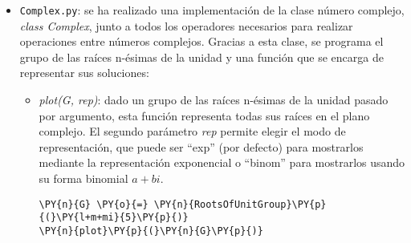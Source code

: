 \begin{itemize}
\begin{itemize}
    \begin{Verbatim}[commandchars=\\\{\}]
p(1)=3
p(2)=5
p(3)=1
p(4)=4
p(5)=2
    \end{Verbatim}

   \item  \textit{even\_permutation}, \textit{odd\_permutation}: se añaden los
siguientes métodos encargados de calcular si una permutación es par o
impar.

    \begin{tcolorbox}[breakable, size=fbox, boxrule=1pt, pad at break*=1mm,colback=cellbackground, colframe=cellborder]
\begin{Verbatim}[commandchars=\\\{\}]
\PY{n}{p}\PY{o}{.}\PY{n}{odd\PYZus{}permutation}\PY{p}{(}\PY{p}{)}
\end{Verbatim}
\end{tcolorbox}

            \begin{tcolorbox}[breakable, size=fbox, boxrule=.5pt, pad at break*=1mm, opacityfill=0]
\begin{Verbatim}[commandchars=\\\{\}]
False
\end{Verbatim}
\end{tcolorbox}

\end{itemize}

\item \texttt{Complex.py}: se ha realizado una implementación de la
  clase número complejo, \textit{class Complex}, junto a todos los
  operadores necesarios para realizar operaciones entre números
  complejos. Gracias a esta clase, se programa el grupo de las raíces
  n-ésimas de la unidad y una función que se encarga de representar sus
  soluciones:
  \begin{itemize}
    \item \textit{plot(G, rep)}: dado un grupo de las raíces n-ésimas de
  la unidad pasado por argumento, esta función representa todas sus
  raíces en el plano complejo. El segundo parámetro \textit{rep} permite elegir el modo de representación, que puede ser ``exp'' (por defecto) para mostrarlos mediante la representación exponencial o ``binom'' para mostrarlos usando su forma binomial $a+bi$.


    \begin{tcolorbox}[breakable, size=fbox, boxrule=1pt, pad at break*=1mm,colback=cellbackground, colframe=cellborder]
\begin{Verbatim}[commandchars=\\\{\}]
\PY{n}{G} \PY{o}{=} \PY{n}{RootsOfUnitGroup}\PY{p}{(}\PY{l+m+mi}{5}\PY{p}{)}
\PY{n}{plot}\PY{p}{(}\PY{n}{G}\PY{p}{)}
\end{Verbatim}
\end{tcolorbox}


\end{itemize}
\end{itemize}
